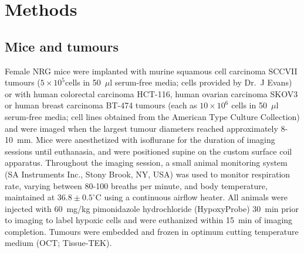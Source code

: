 \section{Methods}
\subsection{Mice and tumours}

 
Female NRG mice were implanted with murine squamous cell carcinoma SCCVII tumours ($5 \times 10^5 $cells in 50~$\mu$l serum-free media; cells provided by Dr.\ J Evans) or with human colorectal carcinoma HCT-116, human ovarian carcinoma SKOV3 or human breast carcinoma BT-474 tumours (each as $10 \times 10^6$ cells in 50~$\mu$l serum-free media; cell lines obtained from the American Type Culture Collection) and were imaged when the largest tumour diameters reached approximately 8-10~mm.
Mice were anesthetized with isoflurane for the duration of imaging sessions until euthanasia, and were positioned supine on the custom surface coil apparatus.
Throughout the imaging session, a small animal monitoring system (SA Instruments Inc., Stony Brook, NY, USA) was used to monitor respiration rate, varying between 80-100 breaths per minute, and body temperature, maintained at $36.8 \pm 0.5^\circ$C using a continuous airflow heater.
All animals were injected with 60~mg/kg pimonidazole hydrochloride (HypoxyProbe) 30~min prior to imaging to label hypoxic cells and were euthanized within 15~min of imaging completion.
Tumours were embedded and frozen in optimum cutting temperature medium (OCT; Tissue-TEK).

